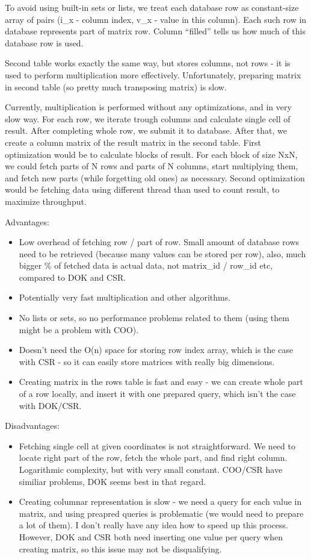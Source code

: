 \documentclass{article}
\begin{document}
To avoid using built-in sets or lists, we treat each database row as constant-size array of pairs (i\_x - column index, v\_x - value in this column). Each such row in database represents part of matrix row. Column ``filled'' tells us how much of this database row is used. 

Second table works exactly the same way, but stores columns, not rows - it is used to perform multiplication more effectively. Unfortunately, preparing matrix in second table (so pretty much transposing matrix) is slow.

Currently, multiplication is performed without any optimizations, and in very slow way. For each row, we iterate trough columns and calculate single cell of result. After completing whole row, we submit it to database. After that, we create a column matrix of the result matrix in the second table. First optimization would be to calculate blocks of result. For each block of size NxN, we could fetch parts of N rows and parts of N columns, start multiplying them, and fetch new parts (while forgetting old ones) as necessary. Second optimization would be fetching data using different thread than used to count result, to maximize throughput.

Advantages:
\begin{itemize}
 \item Low overhead of fetching row / part of row. Small amount of database rows need to be retrieved (because many values can be stored per row), also, much bigger \% of fetched data is actual data, not matrix\_id / row\_id etc, compared to DOK and CSR.
 \item Potentially very fast multiplication and other algorithms.
 \item No lists or sets, so no performance problems related to them (using them might be a problem with COO).
 \item Doesn't need the O(n) space for storing row index array, which is the case with CSR - so it can easily store matrices with really big dimensions.
 \item Creating matrix in the rows table is fast and easy - we can create whole part of a row locally, and insert it with one prepared query, which isn't the case with DOK/CSR.
\end{itemize}

Disadvantages:
\begin{itemize}
 \item Fetching single cell at given coordinates is not straightforward. We need to locate right part of the row, fetch the whole part, and find right column. Logarithmic complexity, but with very small constant. COO/CSR have similiar problems, DOK seems best in that regard.
 \item Creating columnar representation is slow - we need a query for each value in matrix, and using preapred queries is problematic (we would need to prepare a lot of them). I don't really have any idea how to speed up this process. However, DOK and CSR both need inserting one value per query when creating matrix, so this issue may not be disqualifying.
\end{itemize}
\end{document}
